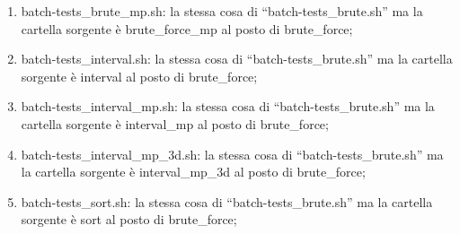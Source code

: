\documentclass[a4paper,11pt]{report}
\begin{document}
\begin{enumerate}
 il tempo medio. Ogni tempo medio viene salvato in un file chiamato ``exec\_time\_BRUTE\_alfa\_\$ALFA.txt'' e alla
 fine il file viene spostato nella cartella ``\_graphs''. Ad ogni extent viene spostato il file ``brute\_force.txt'' 
 nella cartella ``\_result'' che contiene l'esecuzione con quel determinato numero di extents, alfa e dimensione;
 \item batch-tests\_brute\_mp.sh: la stessa cosa di ``batch-tests\_brute.sh'' ma la cartella sorgente \`e 
 brute\_force\_mp al posto di brute\_force;
 \item batch-tests\_interval.sh: la stessa cosa di ``batch-tests\_brute.sh'' ma la cartella sorgente \`e interval al
 posto di brute\_force;
 \item batch-tests\_interval\_mp.sh: la stessa cosa di ``batch-tests\_brute.sh'' ma la cartella sorgente \`e 
 interval\_mp al posto di brute\_force;
 \item batch-tests\_interval\_mp\_3d.sh: la stessa cosa di \newline ``batch-tests\_brute.sh'' ma la cartella sorgente \`e 
 interval\_mp\_3d al posto di brute\_force;
 \item batch-tests\_sort.sh: la stessa cosa di ``batch-tests\_brute.sh'' ma la cartella sorgente \`e 
 sort al posto di brute\_force;
\end{enumerate}

{}

\end{document}
